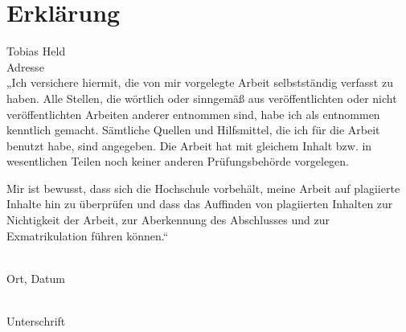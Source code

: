 \section*{Erklärung}

Tobias Held\\
Adresse\\

„Ich versichere hiermit, die von mir vorgelegte Arbeit selbstständig verfasst zu haben. Alle Stellen, die wörtlich oder sinngemäß aus veröffentlichten oder nicht veröffentlichten Arbeiten anderer entnommen sind, habe ich als entnommen kenntlich gemacht. Sämtliche Quellen und Hilfsmittel, die ich für die Arbeit benutzt habe, sind angegeben. Die Arbeit hat mit gleichem Inhalt bzw. in wesentlichen Teilen noch keiner anderen Prüfungsbehörde vorgelegen.

Mir ist bewusst, dass sich die Hochschule vorbehält, meine Arbeit auf plagiierte Inhalte hin zu überprüfen und dass das Auffinden von plagiierten Inhalten zur Nichtigkeit der Arbeit, zur Aberkennung des Abschlusses und zur Exmatrikulation führen können.“
\vspace{3cm}


\noindent\parbox[t]{5cm}{\underline{\hspace{5cm}}\\\noindent Ort, Datum}%
\hfill%
\noindent\parbox[t]{5cm}{\noindent\underline{\hspace{5cm}}\\\noindent Unterschrift}%
